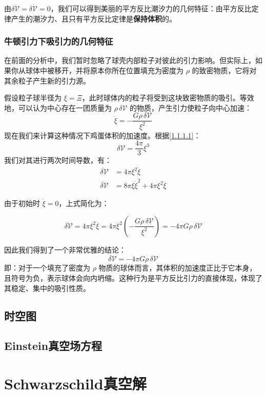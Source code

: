 \documentclass{article}
\begin{document}
由$\delta\ddot{\mathcal V}=\delta\dot{\mathcal V}=0$，我们可以得到美丽的平方反比潮汐力的几何特征：由平方反比定律产生的潮汐力、且只有平方反比定律是\textbf{保持体积}的。

\subsubsection{牛顿引力下吸引力的几何特征}

在前面的分析中，我们暂时忽略了球壳内部粒子对彼此的引力影响。但实际上，如果你从球体中被移开，并将原本你所在位置填充为密度为 $\rho$ 的致密物质，它将对其余粒子产生新的引力源。

假设粒子球半径为 $\xi = \Xi$，此时球体内的粒子将受到这块致密物质的吸引。等效地，可以认为中心存在一团质量为 $\rho \, \delta \mathcal{V}$ 的物质，产生引力使粒子向中心加速：
\begin{equation*}
\ddot{\xi} = -\frac{G \rho \, \delta \mathcal{V}}{\xi^2}
\end{equation*}
现在我们来计算这种情况下鸡蛋体积的加速度。根据\eqref{1.1.1.1}：
\begin{equation*}
\delta \mathcal{V} = \frac{4\pi}{3} \xi^3
\end{equation*}
我们对其进行两次时间导数，有：
\begin{align*}
\dot{\delta \mathcal{V}} &= 4\pi \xi^2 \dot{\xi} \\
\ddot{\delta \mathcal{V}} &= 8\pi \xi \dot{\xi}^2 + 4\pi \xi^2 \ddot{\xi}
\end{align*}

由于初始时 $\dot{\xi} = 0$，上式简化为：

\begin{equation*}
\ddot{\delta \mathcal{V}} = 4\pi \xi^2 \ddot{\xi} = 4\pi \xi^2 \left( -\frac{G \rho \, \delta \mathcal{V}}{\xi^2} \right) = -4\pi G \rho \, \delta \mathcal{V}
\end{equation*}

因此我们得到了一个非常优雅的结论：
\begin{equation}
    \ddot{\delta \mathcal{V}} = -4\pi G \rho \, \delta \mathcal{V}
\end{equation}
即：对于一个填充了密度为 $\rho$ 物质的球体而言，其体积的加速度正比于它本身，且符号为负，表示球体会向内坍缩。这种行为是平方反比引力的直接体现，体现了其稳定、集中的吸引性质。
\subsection{时空图}

\subsection{Einstein真空场方程}

\section{Schwarzschild真空解}
\end{document}
